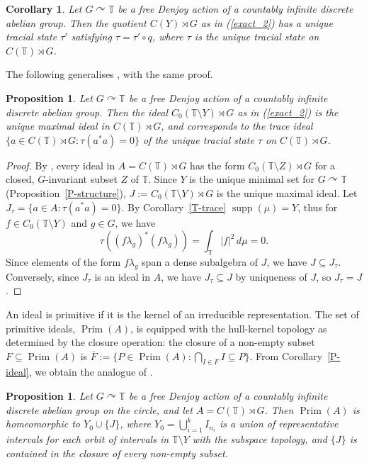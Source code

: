 \documentclass[11pt,a4paper,leqno]{amsart}
\newtheorem{prop}[thm]{Proposition}
\newtheorem{cor}[thm]{Corollary}
\theoremstyle{definition}
\theoremstyle{remark}
\numberwithin{equation}{section}
\theoremstyle{plain}
\DeclareMathOperator{\supp}{supp}
\DeclareMathOperator{\prim}{Prim}
\newcommand{\Tb}{\mathbb{T}}
\begin{document}
\begin{cor}\label{C-quotient trace}
     Let $G\curvearrowright \Tb$ be a free Denjoy action of a countably infinite discrete abelian group. Then the quotient $C(Y)\rtimes G$ as in (\ref{exact_2}) has a unique tracial state $\tau'$ satisfying $\tau = \tau'\circ q$, where $\tau$ is the unique tracial state on $C(\Tb)\rtimes G$. 
\end{cor}

The following generalises \cite[Proposition 4.1]{PutSchSka86}, with the same proof.

\begin{prop}
    Let $G\curvearrowright \Tb$ be a free Denjoy action of a countably infinite discrete abelian group. Then the ideal $C_0(\Tb\setminus Y)\rtimes G$ as in (\ref{exact_2}) is the unique maximal ideal in $C(\Tb)\rtimes G$, and corresponds to the trace ideal $\{a \in C(\Tb)\rtimes G : \tau(a^*a) = 0\}$ of the unique tracial state $\tau$ on $C(\Tb)\rtimes G$. 
\end{prop}

\begin{proof}
    By \cite[Theorem 5.15]{Zel68}, every ideal in $A = C(\Tb)\rtimes G$ has the form $C_0(\Tb\setminus Z)\rtimes G$ for a closed, $G$-invariant subset $Z$ of $\Tb$. Since $Y$ is the unique minimal set for $G\curvearrowright \Tb$ (Proposition~\ref{P-structure}), $J := C_0(\Tb\setminus Y)\rtimes G$ is the unique maximal ideal. Let $J_\tau = \{a\in A : \tau(a^*a) = 0\}$. By Corollary~\ref{T-trace} $\supp(\mu) = Y$, thus for $f\in C_0(\Tb\setminus Y)$ and $g\in G$, we have 
    \[
        \tau((f\lambda_g)^*(f\lambda_g)) = \int_{\Tb} |f|^2 \, d\mu = 0.
    \]
    Since elements of the form $f\lambda_g$ span a dense subalgebra of $J$, we have $J\subseteq J_\tau$. Conversely, since $J_\tau$ is an ideal in $A$, we have $J_\tau\subseteq J$ by uniqueness of $J$, so $J_\tau = J$. 
\end{proof}

An ideal is primitive if it is the kernel of an irreducible representation. The set of primitive ideals, $\prim(A)$, is equipped with the hull-kernel topology as determined by the closure operation: the closure of a non-empty subset $F\subseteq \prim(A)$ is $\overline{F} := \{P \in \prim(A) : \bigcap_{I\in F} I \subseteq P\}$. From Corollary~\ref{P-ideal}, we obtain the analogue of \cite[Proposition 4.4]{PutSchSka86}. 

\begin{prop}\label{P-prim}
    Let $G\curvearrowright \Tb$ be a free Denjoy action of a countably infinite discrete abelian group on the circle, and let $A = C(\Tb)\rtimes G$. Then  $\prim(A)$ is homeomorphic to $Y_0\cup \{J\}$, where $Y_0 = \bigcup_{i=1}^k I_{n_i}$ is a union of representative intervals for each orbit of intervals in $\Tb\setminus Y$ with the subspace topology, and $\{J\}$ is contained in the closure of every non-empty subset. 
\end{prop}
\end{document}
